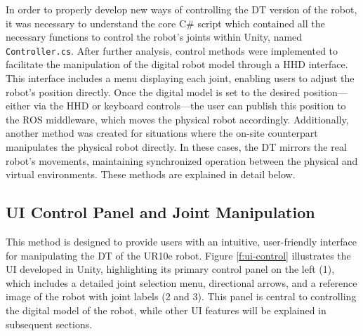 In order to properly develop new ways of controlling the \ac{DT} version of the robot, it was necessary to understand the core C\# script which contained all the necessary functions to control the robot's joints within Unity, named \texttt{Controller.cs}. After further analysis, control methods were implemented to facilitate the manipulation of the digital robot model through a \ac{HHD} interface. This interface includes a menu displaying each joint, enabling users to adjust the robot’s position directly. Once the digital model is set to the desired position—either via the \ac{HHD} or keyboard controls—the user can publish this position to the \ac{ROS} middleware, which moves the physical robot accordingly. Additionally, another method was created for situations where the on-site counterpart manipulates the physical robot directly. In these cases, the \ac{DT} mirrors the real robot’s movements, maintaining synchronized operation between the physical and virtual environments. These methods are explained in detail below.


\subsection{UI Control Panel and Joint Manipulation}
\label{subsection:ui-control-method}
This method is designed to provide users with an intuitive, user-friendly interface for manipulating the \ac{DT} of the UR10e robot. Figure \ref{f:ui-control} illustrates the \ac{UI} developed in Unity, highlighting its primary control panel on the left (1), which includes a detailed joint selection menu, directional arrows, and a reference image of the robot with joint labels (2 and 3). This panel is central to controlling the digital model of the robot, while other \ac{UI} features will be explained in subsequent sections.

